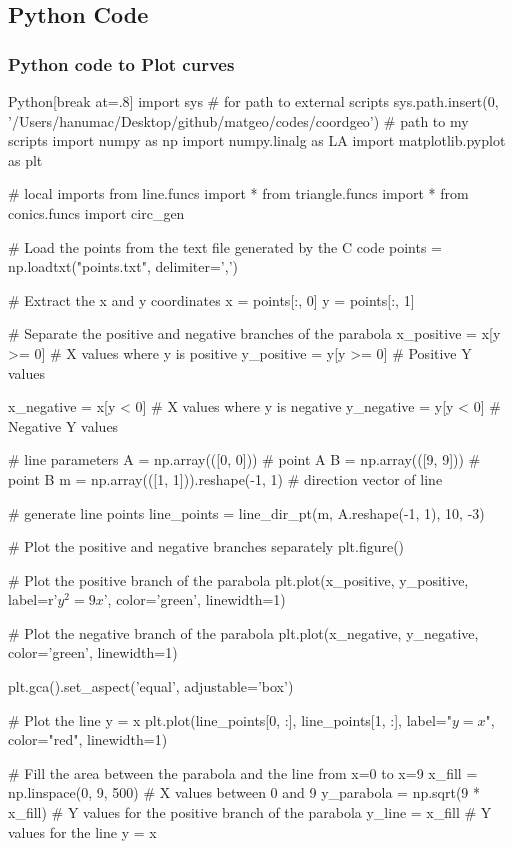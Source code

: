 \documentclass{beamer}
\theoremstyle{remark}
\numberwithin{equation}{section}
\begin{document}
\subsection{Python Code}
\begin{frame}
  \frametitle{Python code to Plot curves}
  \begin{mintedbox}{Python}[break at=.8\textheight]
    import sys  # for path to external scripts
sys.path.insert(0, '/Users/hanumac/Desktop/github/matgeo/codes/coordgeo')  # path to my scripts
import numpy as np
import numpy.linalg as LA
import matplotlib.pyplot as plt

# local imports
from line.funcs import *
from triangle.funcs import *
from conics.funcs import circ_gen

# Load the points from the text file generated by the C code
points = np.loadtxt("points.txt", delimiter=',')

# Extract the x and y coordinates
x = points[:, 0]
y = points[:, 1]

# Separate the positive and negative branches of the parabola
x_positive = x[y >= 0]  # X values where y is positive
y_positive = y[y >= 0]  # Positive Y values

x_negative = x[y < 0]   # X values where y is negative
y_negative = y[y < 0]   # Negative Y values

# line parameters
A = np.array(([0, 0]))  # point A
B = np.array(([9, 9]))  # point B
m = np.array(([1, 1])).reshape(-1, 1)  # direction vector of line

# generate line points
line_points = line_dir_pt(m, A.reshape(-1, 1), 10, -3)

# Plot the positive and negative branches separately
plt.figure()

# Plot the positive branch of the parabola
plt.plot(x_positive, y_positive, label=r'$y^2 = 9x$', color='green', linewidth=1)

# Plot the negative branch of the parabola
plt.plot(x_negative, y_negative, color='green', linewidth=1)

plt.gca().set_aspect('equal', adjustable='box')

# Plot the line y = x
plt.plot(line_points[0, :], line_points[1, :], label="$ y = x $", color="red", linewidth=1)

# Fill the area between the parabola and the line from x=0 to x=9
x_fill = np.linspace(0, 9, 500)  # X values between 0 and 9
y_parabola = np.sqrt(9 * x_fill)  # Y values for the positive branch of the parabola
y_line = x_fill  # Y values for the line y = x


\end{mintedbox}
\end{frame}
\end{document}
